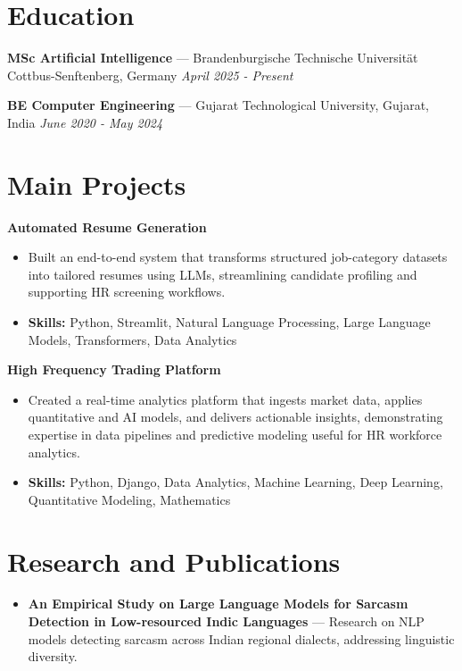 \documentclass[a4paper,10pt]{article}
\begin{document}
\section*{Education}
\textbf{MSc Artificial Intelligence} — Brandenburgische Technische Universität Cottbus-Senftenberg, Germany \hfill \textit{April 2025 - Present}\par
\vspace{1.5pt}
\textbf{BE Computer Engineering} — Gujarat Technological University, Gujarat, India \hfill \textit{June 2020 - May 2024}\par

\section*{Main Projects}
\textbf{Automated Resume Generation}\par
\vspace{1pt}
\begin{itemize}
  \item Built an end-to-end system that transforms structured job-category datasets into tailored resumes using LLMs, streamlining candidate profiling and supporting HR screening workflows.
  \item \textbf{Skills:} Python, Streamlit, Natural Language Processing, Large Language Models, Transformers, Data Analytics
\end{itemize}
\vspace{3pt}
\textbf{High Frequency Trading Platform}\par
\vspace{1pt}
\begin{itemize}
  \item Created a real-time analytics platform that ingests market data, applies quantitative and AI models, and delivers actionable insights, demonstrating expertise in data pipelines and predictive modeling useful for HR workforce analytics.
  \item \textbf{Skills:} Python, Django, Data Analytics, Machine Learning, Deep Learning, Quantitative Modeling, Mathematics
\end{itemize}

\section*{Research and Publications}
\begin{itemize}
\item \textbf{An Empirical Study on Large Language Models for Sarcasm Detection in Low-resourced Indic Languages} — Research on NLP models detecting sarcasm across Indian regional dialects, addressing linguistic diversity.
\end{itemize}
\end{document}
